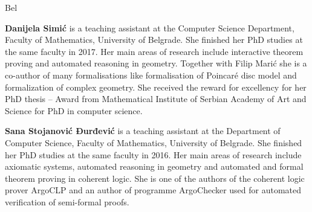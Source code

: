 \begin{sitedescription}{Bel}
\begin{compactitem}
  \item{\bf Danijela Simić} is a teaching assistant at the Computer
    Science Department, Faculty of Mathematics, University of
    Belgrade. She finished her PhD studies at the same faculty in
    2017. Her main areas of research include interactive theorem
    proving and automated reasoning in geometry. Together with Filip
    Marić she is a co-author of many formalisations like formalisation
    of Poincaré disc model
    and formalization of complex geometry.
    She received the reward for excellency for her PhD thesis -- Award
    from Mathematical Institute of Serbian Academy of Art and Science
    for PhD in computer science.
  
  \item{\bf Sana Stojanović Đurđević} is a teaching assistant at the
    Department of Computer Science, Faculty of Mathematics, University
    of Belgrade. She finished her PhD studies at the same faculty in
    2016.  Her main areas of research include axiomatic systems,
    automated reasoning in geometry and automated and formal theorem
    proving in coherent logic. She is one of the authors of the
    coherent logic prover ArgoCLP and an author of programme ArgoChecker
    used for automated verification of semi-formal proofs.
  \end{compactitem}
    
  
  
\end{sitedescription}

